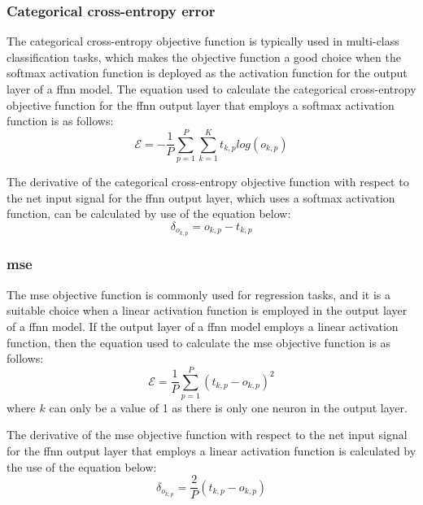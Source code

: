 \documentclass[10pt, conference]{IEEEtran}
\begin{document}
\subsubsection{Categorical cross-entropy error}

The categorical cross-entropy objective function is typically used in multi-class classification tasks, which makes the
objective function a good choice when the softmax activation function is deployed as the activation function for the output
layer of a \acrshort{ffnn} model. The equation used to calculate the categorical cross-entropy objective
function for the \acrshort{ffnn} output layer that employs a softmax activation function is as follows:
\begin{equation}
    \mathcal{E} = -\frac{1}{P} \sum_{p=1}^{P} \sum_{k=1}^{K} t_{k,p}log(o_{k,p}) \label{eq: cce_objective_function}
\end{equation}

The derivative of the categorical cross-entropy objective function with respect to the net input signal for the
\acrshort{ffnn} output layer, which uses a softmax activation function, can be calculated by use of the equation below:
\begin{equation}
    \delta_{o_{k,p}} = o_{k,p} - t_{k,p} \label{eq: softmax_error_signal}
\end{equation}

\subsubsection{\acrshort{mse}}

The \acrshort{mse} objective function is commonly used for regression tasks, and it is a suitable choice when a linear
activation function is employed in the output layer of a \acrshort{ffnn} model. If the output layer of a \acrshort{ffnn}
model employs a linear activation function, then the equation used to calculate the \acrshort{mse} objective
function is as follows:
\begin{equation}
    \mathcal{E} = \frac{1}{P} \sum_{p=1}^{P} (t_{k,p} - o_{k,p})^2 \label{eq: mse_objective_function}
\end{equation}
where $k$ can only be a value of 1 as there is only one neuron in the output layer.

The derivative of the \acrshort{mse} objective function with respect to the net input signal for the \acrshort{ffnn} output
layer that employs a linear activation function is calculated by the use of the equation below:
\begin{equation}
    \delta_{o_{k,p}} = \frac{2}{P} (t_{k,p} - o_{k,p}) \label{eq: mse_error_signal}
\end{equation}
\end{document}
